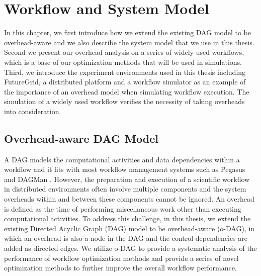 \chapter{Workflow and System Model}
\label{chap:model}

In this chapter, we first introduce how we extend the existing DAG model to be overhead-aware and we also describe the system model that we use in this thesis. Second we present our overhead analysis on a series of widely used workflows, which is a base of our optimization methods that will be used in simulations. Third, we introduce the experiment environments used in this thesis including FutureGrid, a distributed platform and a workflow simulator as an example of the importance of an overhead model when simulating workflow execution. The simulation of a widely used workflow verifies the necessity of taking overheads into consideration.

\section{Overhead-aware DAG Model}

A DAG models the computational activities and data dependencies within a workflow and it fits with most workflow management systems such as Pegasus \cite{Deelman2004} and DAGMan \cite{Kalayci2010}. However, the preparation and execution of a scientific workflow in distributed environments often involve multiple components and the system overheads within and between these components cannot be ignored. 
An overhead is defined as the time of performing miscellaneous work other than executing computational activities. 
To address this challenge, in this thesis, we extend the existing Directed Acyclic Graph (DAG) model to be overhead-aware (o-DAG), in which an overhead is also a node in the DAG and the control dependencies are added as directed edges. We utilize o-DAG to provide a systematic analysis of the performance of workflow optimization methods and provide a series of novel optimization methods to further improve the overall workflow performance. 





